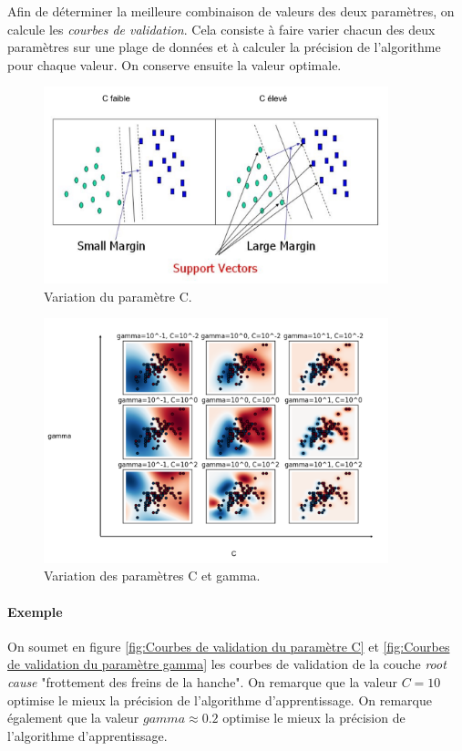 Afin de déterminer la meilleure combinaison de valeurs des deux paramètres, on calcule les \emph{courbes de validation}. Cela consiste à faire varier chacun des deux paramètres sur une plage de données et à calculer la précision de l'algorithme pour chaque valeur. On conserve ensuite la valeur optimale. 

 \begin{figure}[h]
 	\centering\includegraphics[width=10cm]{images/variation_C.png}
 	\caption[Variation du paramètre C]{Variation du paramètre C.}
 	\label{fig:Variation du paramètre C}
 \end{figure}
 
 \begin{figure}[h]
 	\centering\includegraphics[width=10cm]{images/variation_C_gamma.png}
 	\caption[Variation des paramètres C et gamma]{Variation des paramètres C et gamma.}
 	\label{fig:Variation des paramètres C et gamma}
 \end{figure}

 \paragraph{Exemple}
 On soumet en figure \ref{fig:Courbes de validation du paramètre C} et \ref{fig:Courbes de validation du paramètre gamma} les courbes de validation de la couche \emph{root cause} "frottement des freins de la hanche". On remarque que la valeur $C = 10$ optimise le mieux la précision de l'algorithme d'apprentissage. On remarque également que la valeur $gamma \approx 0.2$ optimise le mieux la précision de l'algorithme d'apprentissage.

